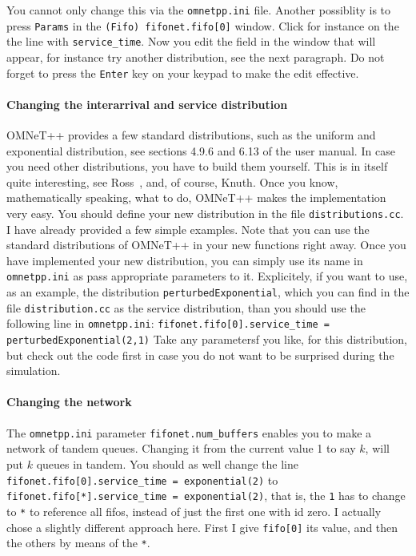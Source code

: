 \documentclass[a4paper]{article}
\begin{document}
You cannot only change this via the \texttt{omnetpp.ini} file. Another
possiblity is to press \texttt{Params} in the \texttt{(Fifo)
  fifonet.fifo[0]} window. Click for instance on the the line with
\texttt{service\_time}. Now you edit the field in the window that will
appear, for instance try another distribution, see the next paragraph.
Do not forget to press the \texttt{Enter} key on your keypad to make
the edit effective.

\paragraph{Changing the interarrival and service distribution}
\label{sec:chang-inter-serv-1}
OMNeT++ provides a few standard distributions, such as the uniform and
exponential distribution, see sections 4.9.6 and 6.13 of the user
manual. In case you need other distributions, you have to build them
yourself. This is in itself quite interesting, see Ross~\cite{Ross93},
and, of course, Knuth\cite{Knuth97}. Once you know, mathematically
speaking, what to do, OMNeT++ makes the implementation very easy.  You
should define your new distribution in the file
\texttt{distributions.cc}. I have already provided a few simple
examples.  Note that you can use the standard distributions of OMNeT++
in your new functions right away. Once you have implemented your new
distribution, you can simply use its name in \texttt{omnetpp.ini} as
pass appropriate parameters to it. Explicitely, if you want to use, as
an example, the distribution \texttt{perturbedExponential}, which you
can find in the file \texttt{distribution.cc} as
the service distribution, than you should use the following line in
\texttt{omnetpp.ini}:
\texttt{fifonet.fifo[0].service\_time = perturbedExponential(2,1)}
Take any parametersf you like, for this distribution, but check out
the code first in case you do not want to be surprised during the
simulation.

\paragraph{Changing the network}
\label{sec:changing-network}
The \texttt{omnetpp.ini} parameter \texttt{fifonet.num\_buffers}
enables you to make a network of tandem queues. Changing it from the
current value 1 to say $k$, will put $k$ queues in tandem. You should
as well change the line
 \texttt{fifonet.fifo[0].service\_time = exponential(2)}  to
\texttt{fifonet.fifo[*].service\_time = exponential(2)}, that is, the
\texttt{1} has to  change to \texttt{*} to reference all fifos, instead of
just the first one with id zero. I actually chose a slightly different
approach here. First I give \texttt{fifo[0]} its value, and then the
others by means of the \texttt{*}.
\end{document}
